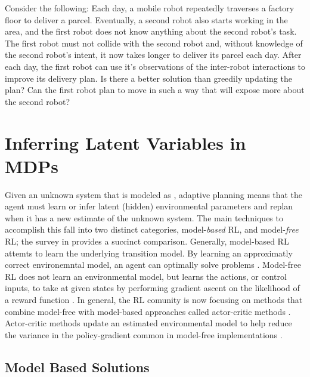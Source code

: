     Consider the following: Each day, a mobile robot repeatedly traverses a factory floor to deliver a parcel.
    Eventually, a second robot also starts working in the area, and the first robot does not know anything about the
    second robot's task. The first robot must not collide with the second robot and, without knowledge of the second
    robot's intent, it now takes longer to deliver its parcel each day. After each day, the first robot can use it's
    observations of the inter-robot interactions to improve its delivery plan. Is there a better solution than greedily
    updating the plan?  Can the first robot plan to move in such a way that will expose more about the second robot?

\section{Inferring Latent Variables in MDPs}\label{sec:literature_hipmdp}


    Given an unknown system that is modeled as , adaptive planning \cite{hernandez2012adaptive} means that the
    agent must learn or infer latent (hidden) environmental parameters and replan when it has a new estimate of the
    unknown system. The main techniques to accomplish this fall into two distinct categories, model-\textit{based}
    \ac{RL}, and model-\textit{free} \ac{RL}; the survey in \cite{polydoros2017survey} provides a succinct comparison.
    Generally, model-based \ac{RL} attemts to learn the underlying transition model. By learning an approximatly correct
    environemntal model, an agent can optimally solve problems
    \cite{Fu-RSS-14}\cite{bertuccelli2012robust}\cite{deisenroth2011pilco}. Model-free \ac{RL} does not learn an
    environmental model, but learns the actions, or control inputs, to take at given states by performing gradient
    ascent on the likelihood of a reward function \cite{williams1992simple}\cite{peters2008reinforcement}. In general,
    the \ac{RL} comunity is now focusing on methods that combine model-free with model-based approaches called
    actor-critic methods \cite{konda2000actor}. Actor-critic methods update an estimated environmental model to help
    reduce the variance in the policy-gradient common in model-free implementations \cite{peters2008reinforcement}.

\subsection{Model Based Solutions}\label{sec:model_based_lit}


